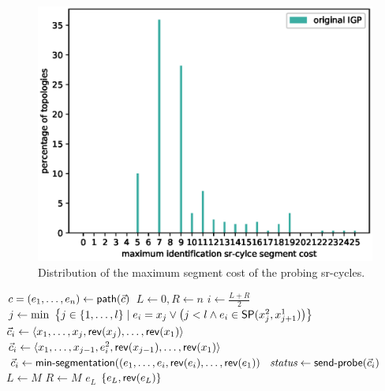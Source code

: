 \begin{figure}
\begin{center}
\includegraphics[width=.85\columnwidth]{./Network-lib/data/plot/minSegCover_identification_orig.eps}
\end{center}
\caption{Distribution of the maximum segment cost of the probing sr-cycles.}
\label{fig:min-seg-cost-segcost-orig}
\end{figure}


\begin{algorithm}[t]
\small
\caption{$\textsf{find-faulty-edge}\left( g, \sr{c} = \langle x_1, \ldots, x_l \rangle \right)$}
\begin{algorithmic}[1]
\STATE $c = (e_1, \ldots, e_n) \gets \seq(\sr{c})$
\STATE $L \gets 0, R \gets n$
  \STATE $i \gets \frac{L + R}{2}$
    \STATE $j \gets \min \ \left\{ j \in \{ 1, \ldots, l \} \mid e_i = x_j \vee \left(j < l \wedge e_i \in \sp(x^2_{j}, x^1_{j + 1})\right) \right\}$
      \STATE $\sr{c}_i \gets \langle x_1, \ldots, x_j, \rev(x_j), \ldots, \rev(x_1) \rangle$
    \ELSE
      \STATE $\sr{c}_i \gets \langle x_1, \ldots, x_{j - 1}, e^2_i, \rev(x_{j - 1}), \ldots, \rev(x_1) \rangle$
    \ENDIF
  \ELSE
    \STATE $\sr{c}_i \gets \textsf{min-segmentation}((e_1, \ldots, e_i, \rev(e_i), \ldots, \rev(e_1))$
  \ENDIF
  \STATE $\textit{status} \gets \textsf{send-probe}(\sr{c}_i)$
    \STATE $L \gets M$
  \ELSE
    \STATE $R \gets M$
  \ENDIF
\ENDWHILE
{}
  \RETURN $e_L$
\ENDIF
\RETURN $\{ e_L, \rev(e_L) \}$
\end{algorithmic}
\label{algo:findedge}
\end{algorithm}

